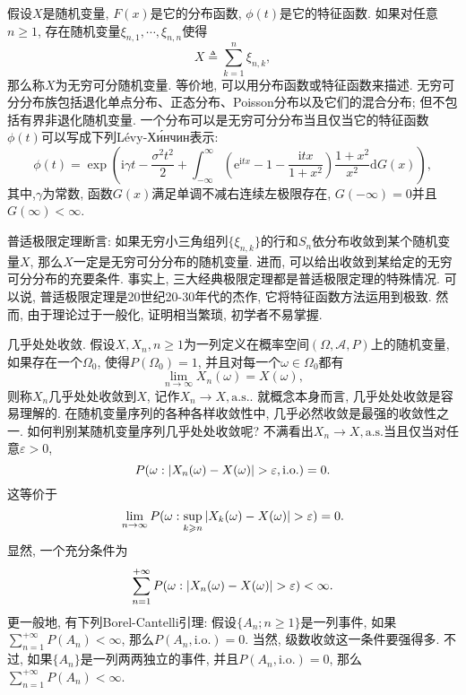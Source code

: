 \documentclass[a4paper,AutoFakeBold,oneside,12pt]{article}
\begin{document}
假设$X$是随机变量, $F(x)$是它的分布函数, $\phi(t)$是它的特征函数. 如果对任意$n\geqslant 1$, 存在随机变量$\xi_{n,1},\cdots,\xi_{n,n}$使得
\begin{equation}
    X\triangleq \sum_{k = 1}^{n}\xi_{n,k},
\end{equation}
那么称$X$为无穷可分随机变量. 等价地, 可以用分布函数或特征函数来描述. 无穷可分分布族包括退化单点分布、正态分布、Poisson分布以及它们的混合分布; 但不包括有界非退化随机变量. 一个分布可以是无穷可分分布当且仅当它的特征函数$\phi(t)$可以写成下列Lévy-Хи́нчин表示:
\begin{equation}
    \phi(t)= \exp\left(\mathrm{i}\gamma t-\frac{\sigma^2t^2}{2}+\int_{-\infty}^{\infty}\left(\mathrm{e}^{\mathrm{i}tx}-1-\frac{\mathrm{i}tx}{1+x^2}\right)\frac{1+x^2}{x^2}\mathrm{d}G(x) \right),
\end{equation}
其中,$\gamma$为常数, 函数$G(x)$满足单调不减右连续左极限存在, $G(-\infty) = 0$并且$G(\infty)<\infty$.

普适极限定理断言: 如果无穷小三角组列$\{\xi_{n,k}\}$的行和$S_n$依分布收敛到某个随机变量$X$, 那么$X$一定是无穷可分分布的随机变量. 进而, 可以给出收敛到某给定的无穷可分分布的充要条件. 事实上, 三大经典极限定理都是普适极限定理的特殊情况. 可以说, 普适极限定理是20世纪20-30年代的杰作, 它将特征函数方法运用到极致. 然而, 由于理论过于一般化, 证明相当繁琐, 初学者不易掌握.

几乎处处收敛. 假设$X,X_n,n\geqslant 1$为一列定义在概率空间$(\Omega,\mathscr{A},P)$上的随机变量, 如果存在一个$\Omega_0$, 使得$P(\Omega_0) = 1$, 并且对每一个$\omega\in\Omega_0$都有
\begin{equation}
    \lim_{n\to\infty}X_n(\omega) = X(\omega),
\end{equation}
则称$X_n$几乎处处收敛到$X$, 记作$X_n\to X,\mathrm{a.s.}$. 就概念本身而言, 几乎处处收敛是容易理解的. 在随机变量序列的各种各样收敛性中, 几乎必然收敛是最强的收敛性之一. 如何判别某随机变量序列几乎处处收敛呢? 不满看出$X_n\to X,\mathrm{a.s.}$当且仅当对任意$\varepsilon>0$,
\begin{equation}
    P(\omega:\abs{X_n(\omega)-X(\omega)}>\varepsilon,\mathrm{i.o.}) = 0.
\end{equation}
这等价于\begin{equation}
    \lim_{n\to\infty}P(\omega:\sup_{k\geqslant n}\abs{X_k(\omega)-X(\omega)}>\varepsilon) = 0.
\end{equation}
显然, 一个充分条件为\begin{equation}
    \sum_{n = 1}^{+\infty}P(\omega:\abs{X_n(\omega)-X(\omega)}>\varepsilon)<\infty.
\end{equation}
更一般地, 有下列Borel-Cantelli引理: 假设$\{A_n;n\geqslant 1\}$是一列事件, 如果$\sum_{n =1}^{+\infty}P(A_n)<\infty$, 那么$P(A_n,\mathrm{i.o.}) = 0$. 当然, 级数收敛这一条件要强得多. 不过, 如果$\{A_n\}$是一列两两独立的事件, 并且$P(A_n,\mathrm{i.o.}) = 0$, 那么$\sum_{n = 1}^{+\infty}P(A_n)<\infty$.
\end{document}

